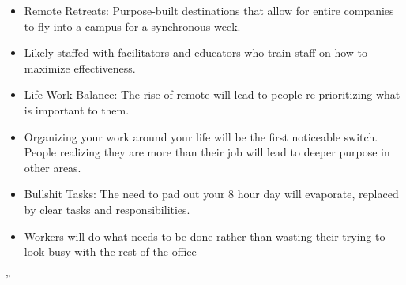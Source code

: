 {\begin{itemize}
\item Remote Retreats: Purpose-built destinations that allow for entire companies to fly into a campus for a synchronous week.
\item Likely staffed with facilitators and educators who train staff on how to maximize effectiveness.
\item Life-Work Balance: The rise of remote will lead to people re-prioritizing what is important to them.
\item Organizing your work around your life will be the first noticeable switch. People realizing they are more than their job will lead to deeper purpose in other areas.
\item Bullshit Tasks: The need to pad out your 8 hour day will evaporate, replaced by clear tasks and responsibilities.
\item Workers will do what needs to be done rather than wasting their trying to look busy with the rest of the office
\end{itemize}
''}

